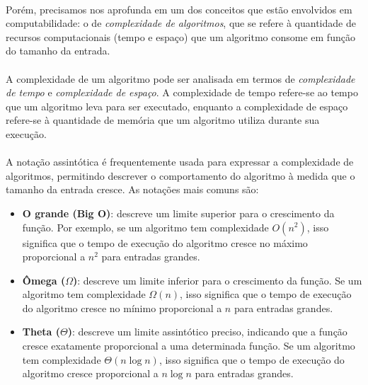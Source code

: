 \documentclass[12pt,a4paper]{article}
\begin{document}
\paragraph{}
Porém, precisamos nos aprofunda em um dos conceitos que estão envolvidos em computabilidade: o de \emph{complexidade de algoritmos}, que se refere à quantidade de recursos computacionais (tempo e espaço) que um algoritmo consome em função do tamanho da entrada.

\paragraph{}
A complexidade de um algoritmo pode ser analisada em termos de \emph{complexidade de tempo} e \emph{complexidade de espaço}. A complexidade de tempo refere-se ao tempo que um algoritmo leva para ser executado, enquanto a complexidade de espaço refere-se à quantidade de memória que um algoritmo utiliza durante sua execução.

\paragraph{}
A notação assintótica é frequentemente usada para expressar a complexidade de algoritmos, permitindo descrever o comportamento do algoritmo à medida que o tamanho da entrada cresce. As notações mais comuns são:
\begin{itemize}\setlength{\itemsep}{2pt}
    \item \textbf{O grande (Big O)}: descreve um limite superior para o crescimento da função. Por exemplo, se um algoritmo tem complexidade \(O(n^2)\), isso significa que o tempo de execução do algoritmo cresce no máximo proporcional a \(n^2\) para entradas grandes.
    \item \textbf{Ômega (\(\Omega\))}: descreve um limite inferior para o crescimento da função. Se um algoritmo tem complexidade \(\Omega(n)\), isso significa que o tempo de execução do algoritmo cresce no mínimo proporcional a \(n\) para entradas grandes.
    \item \textbf{Theta (\(\Theta\))}: descreve um limite assintótico preciso, indicando que a função cresce exatamente proporcional a uma determinada função. Se um algoritmo tem complexidade \(\Theta(n \log n)\), isso significa que o tempo de execução do algoritmo cresce proporcional a \(n \log n\) para entradas grandes.
\end{itemize}
\end{document}
